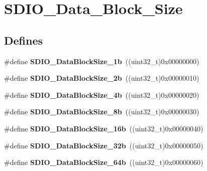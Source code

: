 \hypertarget{group__SDIO__Data__Block__Size}{
\section{SDIO\_\-Data\_\-Block\_\-Size}
\label{group__SDIO__Data__Block__Size}
}
\subsection*{Defines}
\begin{DoxyCompactItemize}
\item 
\hypertarget{group__SDIO__Data__Block__Size_gaa86e90ddc3426b242a5230b3360c620d}{
\#define {\bfseries SDIO\_\-DataBlockSize\_\-1b}~((uint32\_\-t)0x00000000)}
\label{group__SDIO__Data__Block__Size_gaa86e90ddc3426b242a5230b3360c620d}

\item 
\hypertarget{group__SDIO__Data__Block__Size_ga7209d9d52635b66df85712c6fcd668ea}{
\#define {\bfseries SDIO\_\-DataBlockSize\_\-2b}~((uint32\_\-t)0x00000010)}
\label{group__SDIO__Data__Block__Size_ga7209d9d52635b66df85712c6fcd668ea}

\item 
\hypertarget{group__SDIO__Data__Block__Size_ga59cbaecfdebd63177d1208c268626f0a}{
\#define {\bfseries SDIO\_\-DataBlockSize\_\-4b}~((uint32\_\-t)0x00000020)}
\label{group__SDIO__Data__Block__Size_ga59cbaecfdebd63177d1208c268626f0a}

\item 
\hypertarget{group__SDIO__Data__Block__Size_ga14f91159c8c4faf49a335ed9b6a94d0b}{
\#define {\bfseries SDIO\_\-DataBlockSize\_\-8b}~((uint32\_\-t)0x00000030)}
\label{group__SDIO__Data__Block__Size_ga14f91159c8c4faf49a335ed9b6a94d0b}

\item 
\hypertarget{group__SDIO__Data__Block__Size_ga52a7bdab9a75edd94d9c1152e8b078e2}{
\#define {\bfseries SDIO\_\-DataBlockSize\_\-16b}~((uint32\_\-t)0x00000040)}
\label{group__SDIO__Data__Block__Size_ga52a7bdab9a75edd94d9c1152e8b078e2}

\item 
\hypertarget{group__SDIO__Data__Block__Size_gad0f89aa989c0cedf8d69eb28548413ca}{
\#define {\bfseries SDIO\_\-DataBlockSize\_\-32b}~((uint32\_\-t)0x00000050)}
\label{group__SDIO__Data__Block__Size_gad0f89aa989c0cedf8d69eb28548413ca}

\item 
\hypertarget{group__SDIO__Data__Block__Size_ga981c219228ae8df11a501e15843338d4}{
\#define {\bfseries SDIO\_\-DataBlockSize\_\-64b}~((uint32\_\-t)0x00000060)}
\label{group__SDIO__Data__Block__Size_ga981c219228ae8df11a501e15843338d4}


\end{DoxyCompactItemize}
